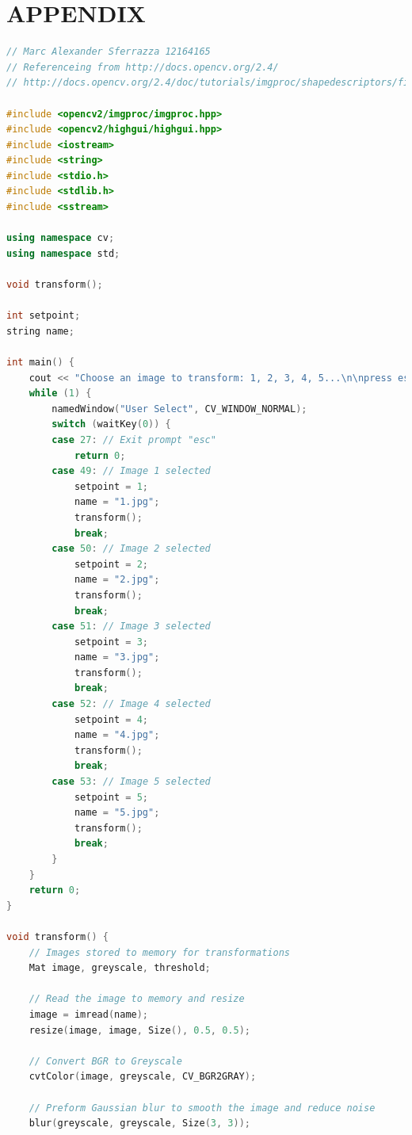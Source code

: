 \documentclass[a4paper, 10pt]{article}
\begin{document}
\nocite{*}




\clearpage
\section*{APPENDIX}

\begin{lstlisting}[language = C++]
// Marc Alexander Sferrazza 12164165
// Referenceing from http://docs.opencv.org/2.4/
// http://docs.opencv.org/2.4/doc/tutorials/imgproc/shapedescriptors/find_contours/find_contours.html

#include <opencv2/imgproc/imgproc.hpp>
#include <opencv2/highgui/highgui.hpp>
#include <iostream>
#include <string>
#include <stdio.h>
#include <stdlib.h>
#include <sstream>

using namespace cv;
using namespace std;

void transform();

int setpoint;
string name;

int main() {
	cout << "Choose an image to transform: 1, 2, 3, 4, 5...\n\npress esc to quit\n\n-------------------------------------------------------------------------\n" << endl;
	while (1) {
		namedWindow("User Select", CV_WINDOW_NORMAL);
		switch (waitKey(0)) {
		case 27: // Exit prompt "esc"
			return 0;
		case 49: // Image 1 selected
			setpoint = 1;
			name = "1.jpg";
			transform();
			break;
		case 50: // Image 2 selected
			setpoint = 2;
			name = "2.jpg";
			transform();
			break;
		case 51: // Image 3 selected
			setpoint = 3;
			name = "3.jpg";
			transform();
			break;
		case 52: // Image 4 selected
			setpoint = 4;
			name = "4.jpg";
			transform();
			break;
		case 53: // Image 5 selected
			setpoint = 5;
			name = "5.jpg";
			transform();
			break;
		}
	}
	return 0;
}

void transform() {
	// Images stored to memory for transformations
	Mat image, greyscale, threshold;

	// Read the image to memory and resize
	image = imread(name);   
	resize(image, image, Size(), 0.5, 0.5);

	// Convert BGR to Greyscale
	cvtColor(image, greyscale, CV_BGR2GRAY);
	
	// Preform Gaussian blur to smooth the image and reduce noise
	blur(greyscale, greyscale, Size(3, 3));


\end{lstlisting}
\end{document}
